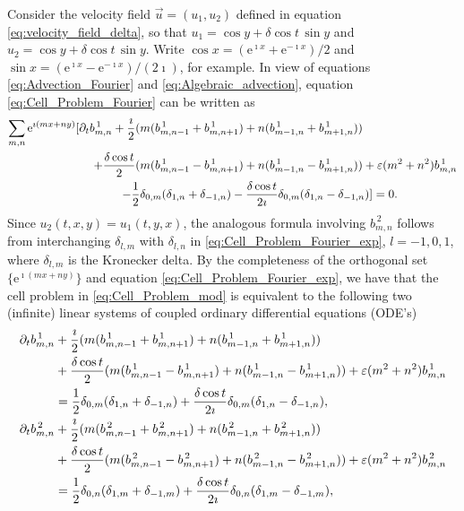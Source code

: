 \documentclass{article}
\newcommand{\e}{\mathrm{e}}
\newcommand{\0}{\mathbf{0}}
\newcommand{\1}{\mathbf{1}}
\newcommand{\2}{\mathbf{2}}
\newcommand{\3}{\mathbf{3}}
\newcommand{\4}{\mathbf{4}}
\newcommand{\5}{\mathbf{5}}
\newcommand{\6}{\mathbf{6}}
\newcommand{\7}{\mathbf{7}}
\newcommand{\8}{\mathbf{8}}
\begin{document}
Consider the velocity field $\vec{u}=(u_1,u_2)$ defined in equation
\eqref{eq:velocity_field_delta}, so that $u_1=\cos{y}+\delta\cos{t}\,\sin{y}$ and
$u_2=\cos{y}+\delta\cos{t}\,\sin{y}$. Write $\cos{x}=(\e^{\imath x}+\e^{-\imath x})/2$
and $\sin{x}=(\e^{\imath x}-\e^{-\imath x})/(2\imath)$, for example. In view of
equations \eqref{eq:Advection_Fourier}
and \eqref{eq:Algebraic_advection}, equation 
\eqref{eq:Cell_Problem_Fourier} can be written as
%
\begin{align}\label{eq:Cell_Problem_Fourier_exp}
  \sum_{m,n}\e^{\imath (mx+ny)}[
    \partial_tb^{\,1}_{m,n}
    +\frac{\imath}{2}(&m(b^{\,1}_{m,n-1}+b^{\,1}_{m,n+1})+n(b^{\,1}_{m-1,n}+b^{\,1}_{m+1,n}))
    \\
    +\frac{\delta\cos{t}}{2}(&m(b^{\,1}_{m,n-1}-b^{\,1}_{m,n+1})+n(b^{\,1}_{m-1,n}-b^{\,1}_{m+1,n}))
    +\varepsilon(m^2+n^2)b^{\,1}_{m,n}
    \notag\\
    -\frac{1}{2}&\delta_{0,m}(\delta_{1,n}+\delta_{-1,n})
          -\frac{\delta\cos{t}}{2\imath}\delta_{0,m}(\delta_{1,n}-\delta_{-1,n})]=0.
    \notag
\end{align}
%
Since $u_2(t,x,y)=u_1(t,y,x)$, the analogous formula involving
$b^{\,2}_{m,n}$ follows from interchanging $\delta_{l,m}$ with $\delta_{l,n}$ in
\eqref{eq:Cell_Problem_Fourier_exp}, $l=-1,0,1$, where $\delta_{l,m}$ is
the Kronecker delta. By the completeness of the orthogonal set
$\{\e^{\imath(mx+ny)}\}$ and equation \eqref{eq:Cell_Problem_Fourier_exp}, we
have that the cell problem in \eqref{eq:Cell_Problem_mod} is
equivalent to the following two (infinite) linear systems of coupled
ordinary differential equations (ODE's)    
%
\begin{align}\label{eq:Cell_Problem_ODE}
  \partial_tb^{\,1}_{m,n}
    &+\frac{\imath}{2}(m(b^{\,1}_{m,n-1}+b^{\,1}_{m,n+1})+n(b^{\,1}_{m-1,n}+b^{\,1}_{m+1,n}))
    \\
    &+\frac{\delta\cos{t}}{2}(m(b^{\,1}_{m,n-1}-b^{\,1}_{m,n+1})+n(b^{\,1}_{m-1,n}-b^{\,1}_{m+1,n}))
    +\varepsilon(m^2+n^2)b^{\,1}_{m,n}
    \notag\\
    &=\frac{1}{2}\delta_{0,m}(\delta_{1,n}+\delta_{-1,n})
          +\frac{\delta\cos{t}}{2\imath}\delta_{0,m}(\delta_{1,n}-\delta_{-1,n}),
    \notag\\
 \partial_tb^{\,2}_{m,n}
    &+\frac{\imath}{2}(m(b^{\,2}_{m,n-1}+b^{\,2}_{m,n+1})+n(b^{\,2}_{m-1,n}+b^{\,2}_{m+1,n}))
    \notag\\
    &+\frac{\delta\cos{t}}{2}(m(b^{\,2}_{m,n-1}-b^{\,2}_{m,n+1})+n(b^{\,2}_{m-1,n}-b^{\,2}_{m+1,n}))
    +\varepsilon(m^2+n^2)b^{\,2}_{m,n}
    \notag\\
    &=\frac{1}{2}\delta_{0,n}(\delta_{1,m}+\delta_{-1,m})
          +\frac{\delta\cos{t}}{2\imath}\delta_{0,n}(\delta_{1,m}-\delta_{-1,m}),
    \notag          
\end{align}
\end{document}
